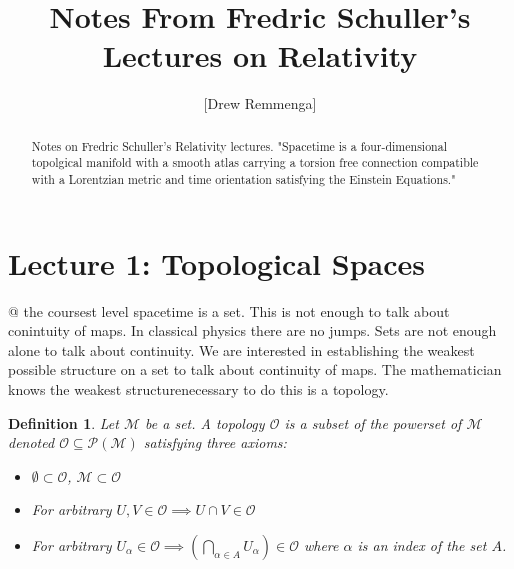\documentclass[10pt, oneside]{article}
\title{Notes From Fredric Schuller's Lectures on Relativity}
\author{[Drew Remmenga]}
\newtheorem{defn}{Definition}
\begin{document}
\maketitle
\begin{abstract}
    Notes on Fredric Schuller's Relativity lectures. "Spacetime is a four-dimensional topolgical manifold with a smooth atlas carrying a torsion free connection compatible with a Lorentzian metric and time orientation satisfying the Einstein Equations."
\end{abstract}
\section*{Lecture 1: Topological Spaces}
   @ the coursest level spacetime is a set. This is not enough to talk about conintuity of maps. In classical physics there are no jumps. Sets are not enough alone to talk about continuity. We are interested in establishing the weakest possible structure on a set to talk about continuity of maps.
   The mathematician knows the weakest structurenecessary to do this is a topology.
   \begin{defn}
       Let $\mathcal{M}$ be a set. A topology $\mathcal{O}$ is a subset of the powerset of $\mathcal{M}$ denoted $\mathcal{O} \subseteq \mathcal{P}(\mathcal{M})$ satisfying three axioms: 
      \begin{itemize}
         \item $\emptyset \subset \mathcal{O}$, $\mathcal{M} \subset \mathcal{O}$
         \item For arbitrary $U, V \in \mathcal{O} \implies U \cap V \in \mathcal{O}$
         \item For arbitrary $U_\alpha \in \mathcal{O} \implies (\bigcap_{\alpha \in A} U_\alpha) \in \mathcal{O}$ where $\alpha$ is an index of the set $A$.
      \end{itemize}
   \end{defn}
\end{document}

